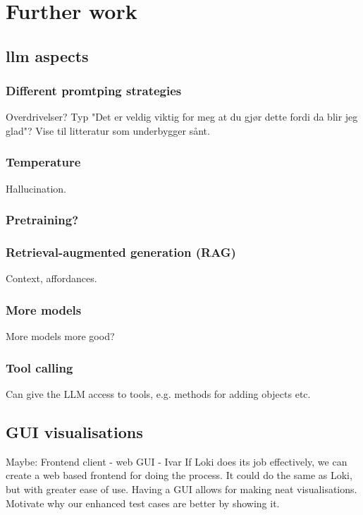 \chapter{Further work}

\section{\acrshort{llm} aspects}

\subsection{Different promtping strategies}

Overdrivelser? Typ "Det er veldig viktig for meg at du gjør dette fordi da blir
jeg glad"? Vise til litteratur som underbygger sånt.

\subsection{Temperature}
Hallucination.

\subsection{Pretraining?}

\subsection{Retrieval-augmented generation (RAG)}
Context, affordances.

\subsection{More models}

More models more good?

\subsection{Tool calling}

Can give the LLM access to tools, e.g. methods for adding objects etc.

\section{GUI visualisations}

Maybe: Frontend client - web GUI - Ivar
If Loki does its job effectively, we can create a web based frontend for doing the process. It could do the same as Loki, but with greater ease of use.
Having a GUI allows for making neat visualisations.
Motivate why our enhanced test cases are better by showing it.

